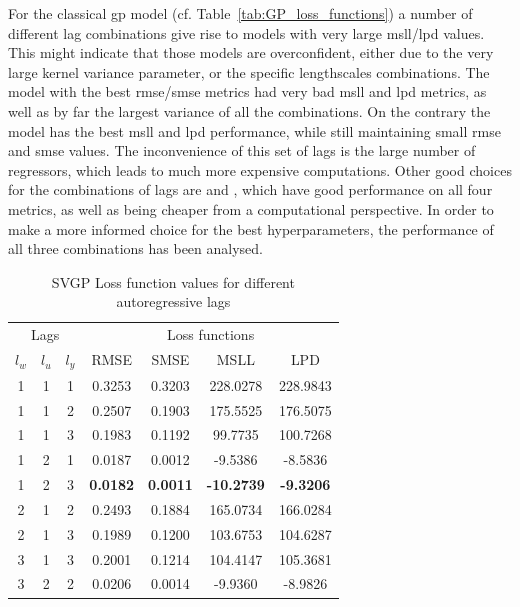 For the classical \acrshort{gp} model (cf. Table~\ref{tab:GP_loss_functions}) a
number of different lag combinations give rise to models with very large
\acrshort{msll}/\acrshort{lpd} values. This might indicate that those models are
overconfident, either due to the very large kernel variance parameter, or the
specific lengthscales combinations. The model with the best
\acrshort{rmse}/\acrshort{smse} metrics  had very bad
\acrshort{msll} and \acrshort{lpd} metrics, as well as by far the largest
variance of all the combinations. On the contrary the  model has
the best \acrshort{msll} and \acrshort{lpd} performance, while still maintaining
small \acrshort{rmse} and \acrshort{smse} values. The inconvenience of this set
of lags is the large number of regressors, which leads to much more expensive
computations. Other good choices for the combinations of lags are
 and , which have good performance on all four
metrics, as well as being cheaper from a computational perspective. In order to
make a more informed choice for the best hyperparameters, the performance of all
three combinations has been analysed.

\clearpage

\begin{table}[ht]
\centering
    \begin{tabular}{||c c c|c c c c||}
        \hline
        \multicolumn{3}{||c|}{Lags} & \multicolumn{4}{c||}{Loss functions}\\
        $l_w$ & $l_u$ & $l_y$ & RMSE & SMSE & MSLL & LPD\\
        \hline \hline
        1 & 1 & 1 & 0.3253 & 0.3203 & 228.0278 & 228.9843 \\
        1 & 1 & 2 & 0.2507 & 0.1903 & 175.5525 & 176.5075 \\
        1 & 1 & 3 & 0.1983 & 0.1192 & 99.7735 & 100.7268 \\
        1 & 2 & 1 & 0.0187 & 0.0012 & -9.5386 & -8.5836 \\
        1 & 2 & 3 & \textbf{0.0182} & \textbf{0.0011} & \textbf{-10.2739} &
        \textbf{-9.3206} \\
        2 & 1 & 2 & 0.2493 & 0.1884 & 165.0734 & 166.0284 \\
        2 & 1 & 3 & 0.1989 & 0.1200 & 103.6753 & 104.6287 \\
        3 & 1 & 3 & 0.2001 & 0.1214 & 104.4147 & 105.3681 \\
        3 & 2 & 2 & 0.0206 & 0.0014 & -9.9360 & -8.9826 \\
        \hline
    \end{tabular}
\caption{SVGP Loss function values for different autoregressive lags}
\label{tab:SVGP_loss_functions}
\end{table}

